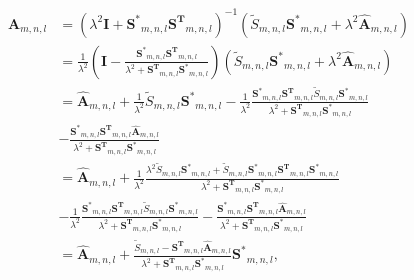 \begin{small}
    \begin{equation}
        \label{eq:filter}
        \begin{aligned}
            \mathbf{A}_{m,n,l}
             & = ( \lambda^{2} \mathbf{I}
            + \mathbf{S^{*}}_{m,n,l} \mathbf{S^{T}}_{m,n,l} )^{-1}
            ( \tilde{S}_{m,n,l} \mathbf{S^{*}}_{m,n,l}
            + \lambda^{2} \mathbf{\hat{A}}_{m,n,l})                          \\
             & = \frac{ 1 } { \lambda^{2} } ( \mathbf{I} -
            \frac{ \mathbf{ S^{*}}_{m,n,l} \mathbf{S^{T} }_{m,n,l} }
            { \lambda^{2} + \mathbf{S^{T}}_{m,n,l} \mathbf{S^{*}}_{m,n,l} })
            ( \tilde{S}_{m,n,l} \mathbf{S^{*}}_{m,n,l}
            + \lambda^{2} \mathbf{\hat{A}}_{m,n,l} )                         \\
             & = \mathbf{\hat{A}}_{m,n,l} + \frac{ 1 } { \lambda^{2} }
            \tilde{S}_{m,n,l} \mathbf{S^{*}}_{m,n,l} - \frac{ 1 } {\lambda^{2}}
            \frac{ \mathbf{S^{*}}_{m,n,l} \mathbf{ S^{T}}_{m,n,l}
                \tilde{S}_{m,n,l} \mathbf{S^{*}}_{m,n,l} }
            { \lambda^{2} + \mathbf{ S^{T}}_{m,n,l} \mathbf{S^{*}}_{m,n,l} } \\
             & - \frac{\mathbf{S^{*}}_{m,n,l} \mathbf{S^{T}}_{m,n,l}
                \mathbf{\hat{A}}_{m,n,l} }
            { \lambda^{2} + \mathbf{S^{T}}_{m,n,l} \mathbf{S^{*}}_{m,n,l} }  \\
             & = \mathbf{\hat{A}}_{m,n,l} + \frac{ 1 } { \lambda^{2} }
            \frac{ \lambda^{2} \tilde{S}_{m,n,l} \mathbf{S^{*}}_{m,n,l} +
                \tilde{S}_{m,n,l} \mathbf{ S^{*}}_{m,n,l} \mathbf{S^{T}}_{m,n,l}
                \mathbf{S^{*}}_{m,n,l} } { \lambda^{2} + \mathbf{S^{T}}_{m,n,l}
            \mathbf{S^{*}}_{m,n,l} }                                         \\
             & - \frac{ 1 } { \lambda^{2} }
            \frac{ \mathbf{S^{*}}_{m,n,l}  \mathbf{S^{T}}_{m,n,l} \tilde{S}_{m,n,l}
                \mathbf{S^{*}}_{m,n,l} } { \lambda^{2} +
                \mathbf{S^{T}}_{m,n,l} \mathbf{S^{*}}_{m,n,l} }
            - \frac{ \mathbf{S^{*}}_{m,n,l} \mathbf{S^{T}}_{m,n,l}
                \mathbf{\hat{A}}_{m,n,l} } { \lambda^{2} + \mathbf{ S^{T}}_{m,n,l}
            \mathbf{S^{*}}_{m,n,l} }                                         \\
             & = \mathbf{\hat{A}}_{m,n,l} + \frac{ \tilde{S}_{m,n,l} -
                \mathbf{S^{T}}_{m,n,l} \mathbf{\hat{A}}_{m,n,l}  }
            { \lambda^{2} + \mathbf{ S^{T}}_{m,n,l}
                \mathbf{S^{*}}_{m,n,l} } \mathbf{ S^{*}}_{m,n,l},
        \end{aligned}
    \end{equation}
\end{small}
